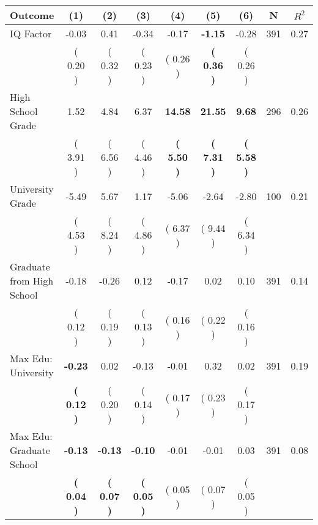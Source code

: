 \begin{tabular}{lcccccccc}
\toprule
 \textbf{Outcome} & \textbf{(1)} & \textbf{(2)} & \textbf{(3)} & \textbf{(4)} & \textbf{(5)} & \textbf{(6)} & \textbf{N} & \textbf{$ R^2$} \\
\midrule
IQ Factor &     -0.03 &      0.41 &     -0.34 &     -0.17 & \textbf{    -1.15} &     -0.28 & 391 &       0.27 \\ 
 & (     0.20 ) & (     0.32 ) & (     0.23 ) & (     0.26 ) & \textbf{(     0.36 )} & (     0.26 ) & \\
High School Grade &      1.52 &      4.84 &      6.37 & \textbf{    14.58} & \textbf{    21.55} & \textbf{     9.68} & 296 &       0.26 \\ 
 & (     3.91 ) & (     6.56 ) & (     4.46 ) & \textbf{(     5.50 )} & \textbf{(     7.31 )} & \textbf{(     5.58 )} & \\
University Grade &     -5.49 &      5.67 &      1.17 &     -5.06 &     -2.64 &     -2.80 & 100 &       0.21 \\ 
 & (     4.53 ) & (     8.24 ) & (     4.86 ) & (     6.37 ) & (     9.44 ) & (     6.34 ) & \\
Graduate from High School &     -0.18 &     -0.26 &      0.12 &     -0.17 &      0.02 &      0.10 & 391 &       0.14 \\ 
 & (     0.12 ) & (     0.19 ) & (     0.13 ) & (     0.16 ) & (     0.22 ) & (     0.16 ) & \\
Max Edu: University & \textbf{    -0.23} &      0.02 &     -0.13 &     -0.01 &      0.32 &      0.02 & 391 &       0.19 \\ 
 & \textbf{(     0.12 )} & (     0.20 ) & (     0.14 ) & (     0.17 ) & (     0.23 ) & (     0.17 ) & \\
Max Edu: Graduate School & \textbf{    -0.13} & \textbf{    -0.13} & \textbf{    -0.10} &     -0.01 &     -0.01 &      0.03 & 391 &       0.08 \\ 
 & \textbf{(     0.04 )} & \textbf{(     0.07 )} & \textbf{(     0.05 )} & (     0.05 ) & (     0.07 ) & (     0.05 ) & \\
\bottomrule
\end{tabular}

